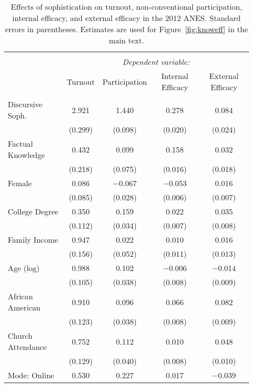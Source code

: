 
\begin{table}[!htbp] \centering 
  \caption[Effects of sophistication on turnout, non-conventional participation, internal efficacy, 
  and external efficacy in the 2012 ANES]{Effects of sophistication on turnout, non-conventional participation, internal efficacy, 
          and external efficacy in the 2012 ANES. Standard errors in parentheses. Estimates are used for
          Figure~\ref{fig:knoweff} in the main text.} 
  \label{tab:knoweff2012} 
\begin{tabular}{@{\extracolsep{0pt}}lcccc} 
\\[-1.8ex]\hline 
\hline \\[-1.8ex] 
 & \multicolumn{4}{c}{\textit{Dependent variable:}} \\ 
\cline{2-5} 
 & Turnout & Participation & Internal Efficacy & External Efficacy \\ 
\hline \\[-1.8ex] 
 Discursive Soph. & 2.921 & 1.440 & 0.278 & 0.084 \\ 
  & (0.299) & (0.098) & (0.020) & (0.024) \\ 
  Factual Knowledge & 0.432 & 0.099 & 0.158 & 0.032 \\ 
  & (0.218) & (0.075) & (0.016) & (0.018) \\ 
  Female & 0.086 & $-$0.067 & $-$0.053 & 0.016 \\ 
  & (0.085) & (0.028) & (0.006) & (0.007) \\ 
  College Degree & 0.350 & 0.159 & 0.022 & 0.035 \\ 
  & (0.112) & (0.034) & (0.007) & (0.008) \\ 
  Family Income & 0.947 & 0.022 & 0.010 & 0.016 \\ 
  & (0.156) & (0.052) & (0.011) & (0.013) \\ 
  Age (log) & 0.988 & 0.102 & $-$0.006 & $-$0.014 \\ 
  & (0.105) & (0.038) & (0.008) & (0.009) \\ 
  African American & 0.910 & 0.096 & 0.066 & 0.082 \\ 
  & (0.123) & (0.038) & (0.008) & (0.009) \\ 
  Church Attendance & 0.752 & 0.112 & 0.010 & 0.048 \\ 
  & (0.129) & (0.040) & (0.008) & (0.010) \\ 
  Mode: Online & 0.530 & 0.227 & 0.017 & $-$0.039 \\ 

\end{tabular}
\end{table}
